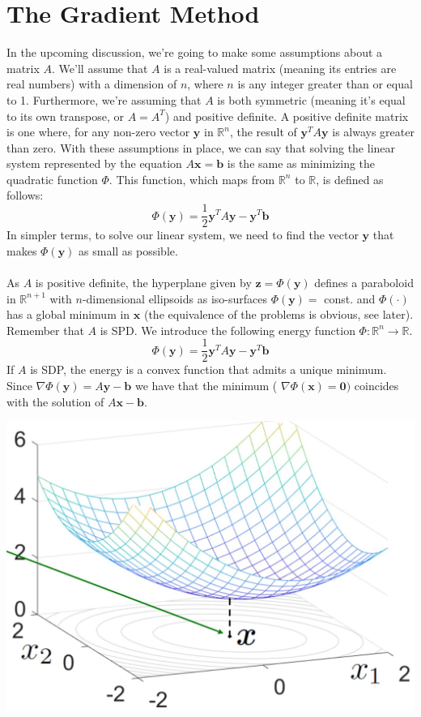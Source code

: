 \documentclass[11pt]{book}
\begin{document}
\section*{The Gradient Method}
In the upcoming discussion, we're going to make some assumptions about a matrix $A$. We'll assume that $A$ is a real-valued matrix (meaning its entries are real numbers) with a dimension of $n$, where $n$ is any integer greater than or equal to 1. 
Furthermore, we're assuming that $A$ is both symmetric (meaning it's equal to its own transpose, or $A=A^{T}$) and positive definite. A positive definite matrix is one where, for any non-zero vector $\mathbf{y}$ in $\mathbb{R}^{n}$, the result of $\mathbf{y}^{T} A \mathbf{y}$ is always greater than zero.
With these assumptions in place, we can say that solving the linear system represented by the equation $A \mathbf{x}=\mathbf{b}$ is the same as minimizing the quadratic function $\Phi$. This function, which maps from $\mathbb{R}^{n}$ to $\mathbb{R}$, is defined as follows:
$$
\Phi(\mathbf{y})=\frac{1}{2} \mathbf{y}^{T} A \mathbf{y}-\mathbf{y}^{T} \mathbf{b}
$$
In simpler terms, to solve our linear system, we need to find the vector $\mathbf{y}$ that makes $\Phi(\mathbf{y})$ as small as possible.\\ \\
As $A$ is positive definite, the hyperplane given by $\mathbf{z}=\Phi(\mathbf{y})$ defines a paraboloid in $\mathbb{R}^{n+1}$ with $n$-dimensional ellipsoids as iso-surfaces $\Phi(\mathbf{y})=$ const. and $\Phi(\cdot)$ has a global minimum in $\mathbf{x}$ (the equivalence of the problems is obvious, see later). Remember that $A$ is SPD. We introduce the following energy function $\Phi: \mathbb{R}^{n} \longrightarrow \mathbb{R}$.
$$
\Phi(\mathbf{y})=\frac{1}{2} \mathbf{y}^{T} A \mathbf{y}-\mathbf{y}^{T} \mathbf{b}
$$
If $A$ is SDP, the energy is a convex function that admits a unique minimum.\\
Since $\nabla \Phi(\mathbf{y})=A \mathbf{y}-\mathbf{b}$ we have that the minimum ( $\nabla \Phi(\mathbf{x})=\mathbf{0})$ coincides with the solution of $A \mathbf{x}-\mathbf{b}$.
\begin{center}
\includegraphics[scale = 0.7,max width=\textwidth]{2023_09_05_b72ccc85584d9dc6fb5cg-073}
\end{center}
\end{document}
